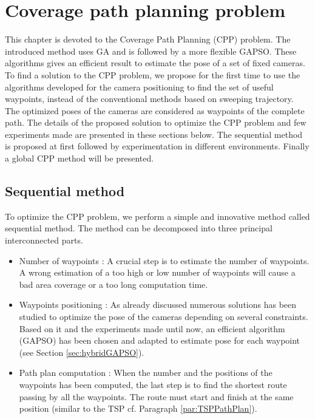 \chapter{Coverage path planning problem} \label{chap:Coverage path planning problem}

\minitoc

This chapter is devoted to the Coverage Path Planning (CPP) problem. %
The introduced method uses GA and is followed by a more flexible GAPSO. These algorithms gives an efficient result to estimate the pose of a set of fixed cameras. To find a solution to the CPP problem, we propose for the first time to use the algorithms developed for the camera positioning to find the set of useful waypoints, instead of the conventional methods based on sweeping trajectory. The optimized poses of the cameras are considered as waypoints of the complete path. 
The details of the proposed solution to optimize the CPP problem and few experiments made are presented in these sections below. The sequential method is proposed at first followed by experimentation in different environments. Finally a global CPP method will be presented.
 

\section{Sequential method} \label{sec:CPPsequantielMethod}
To optimize the CPP problem, we perform a simple and innovative method called sequential method. The method can be decomposed into three principal interconnected parts. 
\begin{itemize}
	\item Number of waypoints : 
	A crucial step is to estimate the number of waypoints. A wrong estimation of a too high or low  number of waypoints will cause a bad area coverage or a too long computation time.
	\item Waypoints positioning : 
	As already discussed numerous solutions has been studied to optimize the pose of the cameras depending on several constraints. Based on it and the experiments made until now, an efficient algorithm (GAPSO) has been chosen and adapted to estimate pose for each waypoint (see Section  \ref{sec:hybridGAPSO}). 
	\item  Path plan computation : 
	 When the number and the positions of the waypoints has been computed, the last step is to find the shortest route  passing by all the waypoints. The route must start and finish at the same position (similar to the TSP cf. Paragraph \ref{par:TSPPathPlan}).
	
\end{itemize}

